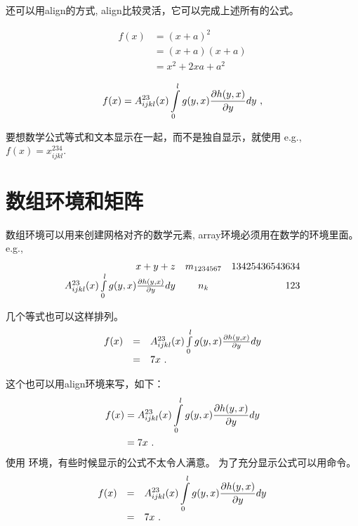 还可以用align的方式, align比较灵活，它可以完成上述所有的公式。

\begin{align*}
	f(x)
		&= (x+a)^2 \\
		&= (x+a)(x+a) \\
		&= x^2 + 2 x a + a^2
\end{align*}

\begin{align}
	f(x)
	= A^{23}_{ijkl}(x) \int_0^l\limits g(y,x) \frac{\partial h(y,x)}{\partial y} d y \ ,
\end{align}

要想数学公式等式和文本显示在一起，而不是独自显示，就使用 \imp{\$\$} e.g., $f(x) = x^{234}_{ijkl}$.


\section{数组环境和矩阵}

数组环境可以用来创建网格对齐的数学元素, array环境必须用在数学的环境里面。e.g.,
\begin{equation}
	\begin{array}{rcr}
	x + y + z 
		& m_{1234567} 
		& 13425436543634 \\
	A^{23}_{ijkl}(x) \int_0^l\limits g(y,x) \frac{\partial h(y,x)}{\partial y} d y 
		& n_{k} 
		& 123
	\end{array}
\end{equation}

几个等式也可以这样排列。
\begin{equation}
	\begin{array}{rcl}
	f(x)
	&=& A^{23}_{ijkl}(x) \int_0^l\limits g(y,x) \frac{\partial h(y,x)}{\partial y} d y \\
	&=& 7 x \ .
	\end{array}
\end{equation}

这个也可以用align环境来写，如下：
\begin{align*}
	f(x)
	&= A^{23}_{ijkl}(x) \int_0^l\limits g(y,x) \frac{\partial h(y,x)}{\partial y} d y \\
	&= 7 x \ .
\end{align*}
使用  环境，有些时候显示的公式不太令人满意。
为了充分显示公式可以用命令。 
\begin{equation}
	\begin{array}{rcl}
	f(x)
	&=& \displaystyle A^{23}_{ijkl}(x) \int_0^l\limits g(y,x) \frac{\partial h(y,x)}{\partial y} d y \\
	&=& 7 x \ .
	\end{array}
\end{equation} 

